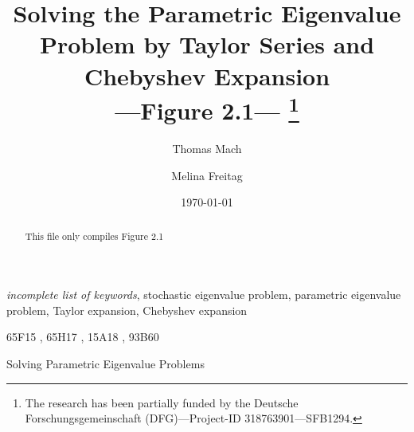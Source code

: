 \documentclass[final]{siamltex}
\title{Solving the Parametric Eigenvalue Problem by Taylor Series and Chebyshev
  Expansion\\---Figure 2.1---%
  \thanks{The research has been partially funded by the Deutsche
Forschungsgemeinschaft (DFG)---Project-ID 318763901---SFB1294.}
}
\author{Thomas Mach\footnotemark[3]\and Melina Freitag\footnotemark[3]}
\begin{document}
\maketitle

\renewcommand{\thefootnote}{\fnsymbol{footnote}}

%



\renewcommand{\thefootnote}{\arabic{footnote}}


\date{\today}
\maketitle

\begin{abstract}
  This file only compiles Figure 2.1
\end{abstract}

\begin{keywords}
\textit{incomplete list of keywords}, %
stochastic eigenvalue problem, %
parametric eigenvalue problem, %
Taylor expansion, %
Chebyshev expansion
\end{keywords}

\begin{AMS}
  65F15%
  , 65H17%
  , 15A18%
  , 93B60%
\end{AMS}

\pagestyle{myheadings} %
\thispagestyle{plain} %
\markboth{%
}%
{Solving Parametric Eigenvalue Problems}


\end{document}
